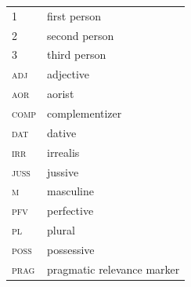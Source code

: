 \documentclass[output=paper,colorlinks,citecolor=brown]{langscibook}
\begin{document}
\begin{tabularx}{.5\textwidth}{ll}
1 & first person \\
2 & second person \\
3 & third person \\
\scshape adj  &  adjective \\
\scshape aor  &  aorist \\
\scshape comp  &  complementizer \\
\scshape dat &   dative \\
\scshape irr  &  irrealis \\
\scshape juss &   jussive \\
\scshape m   & masculine \\
\scshape pfv &   perfective \\
\scshape pl  &  plural \\
\scshape poss &   possessive \\
\scshape prag &   pragmatic relevance marker \\
\end{tabularx}
\end{document}
